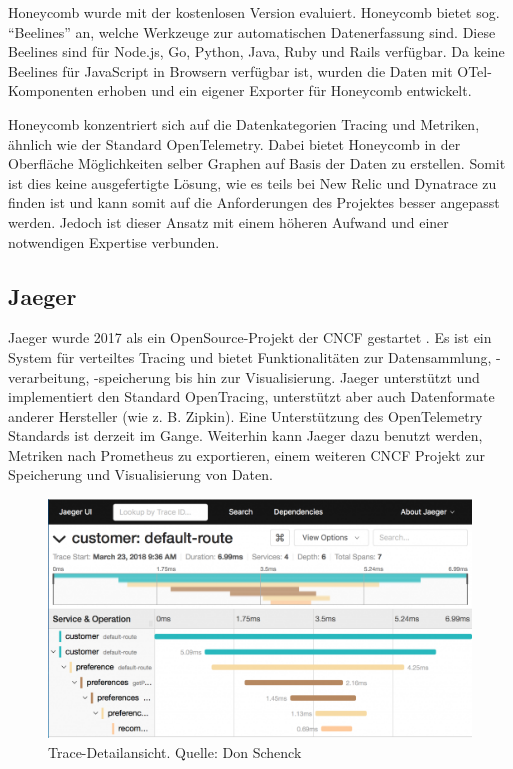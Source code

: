 Honeycomb wurde mit der kostenlosen Version evaluiert. Honeycomb bietet sog. \enquote{Beelines} an, welche Werkzeuge zur automatischen Datenerfassung sind. Diese Beelines sind für Node.js, Go, Python, Java, Ruby und Rails verfügbar. Da keine Beelines für JavaScript in Browsern verfügbar ist, wurden die Daten mit OTel-Komponenten erhoben und ein eigener Exporter für Honeycomb entwickelt.

Honeycomb konzentriert sich auf die Datenkategorien Tracing und Metriken, ähnlich wie der Standard OpenTelemetry. Dabei bietet Honeycomb in der Oberfläche Möglichkeiten selber Graphen auf Basis der Daten zu erstellen. Somit ist dies keine ausgefertigte Lösung, wie es teils bei New Relic und Dynatrace zu finden ist und kann somit auf die Anforderungen des Projektes besser angepasst werden. Jedoch ist dieser Ansatz mit einem höheren Aufwand und einer notwendigen Expertise verbunden.

\subsection{Jaeger}

Jaeger wurde 2017 als ein OpenSource-Projekt der CNCF gestartet \cite{Jaeger}. Es ist ein System für verteiltes Tracing und bietet Funktionalitäten zur Datensammlung, -verarbeitung, -speicherung bis hin zur Visualisierung. Jaeger unterstützt und implementiert den Standard OpenTracing, unterstützt aber auch Datenformate anderer Hersteller (wie z. B. Zipkin). Eine Unterstützung des OpenTelemetry Standards ist derzeit im Gange. Weiterhin kann Jaeger dazu benutzt werden, Metriken nach Prometheus \cite{Prometheus} zu exportieren, einem weiteren CNCF Projekt zur Speicherung und Visualisierung von Daten.

\begin{figure}
\centering
\includegraphics[width=\linewidth]{img/03_methoden/redhat_jaeger-ui_trace-detail-view.png}
\caption{Trace-Detailansicht. Quelle: Don Schenck \cite{JaegerIstioTracing}}
\label{fig:jaeger-ui_trace-detail-view}
\end{figure}

